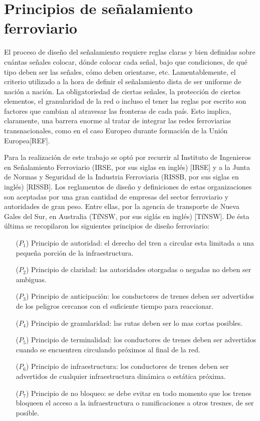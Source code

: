 \section{Principios de señalamiento ferroviario}
    \label{sec:principios}
    
    El proceso de diseño del señalamiento requiere reglas claras y bien definidas sobre cuántas señales colocar, dónde colocar cada señal, bajo que condiciones, de qué tipo deben ser las señales, cómo deben orientarse, etc. Lamentablemente, el criterio utilizado a la hora de definir el señalamiento dista de ser uniforme de nación a nación. La obligatoriedad de ciertas señales, la protección de ciertos elementos, el granularidad de la red o incluso el tener las reglas por escrito son factores que cambian al atravesar las fronteras de cada país. Esto implica, claramente, una barrera enorme al tratar de integrar las redes ferroviarias transnacionales, como en el caso Europeo durante formación de la Unión Europea[REF].
    
    Para la realización de este trabajo se optó por recurrir al Instituto de Ingenieros en Señalamiento Ferroviario (IRSE, por sus siglas en inglés) [IRSE] y a la Junta de Normas y Seguridad de la Industria Ferroviaria (RISSB, por sus siglas en inglés) [RISSB]. Los reglamentos de diseño y definiciones de estas organizaciones son aceptadas por una gran cantidad de empresas del sector ferroviario y autoridades de gran peso. Entre ellas, por la agencia de transporte de Nueva Gales del Sur, en Australia (TfNSW, por sus siglás en inglés) [TfNSW]. De ésta última se recopilaron los siguientes principios de diseño ferroviario:
    
    \begin{itemize}
        \item [($P_1$)] Principio de autoridad: el derecho del tren a circular esta limitada a una pequeña porción de la infraestructura.
        \item [($P_2$)] Principio de claridad: las autoridades otorgadas o negadas no deben ser ambiguas. 
        \item [($P_3$)] Principio de anticipación: los conductores de trenes deben ser advertidos de los peligros cercanos con el suficiente tiempo para reaccionar.
        \item [($P_4$)] Principio de granularidad: las rutas deben ser lo mas cortas posibles.
        \item [($P_5$)] Principio de terminalidad: los conductores de trenes deben ser advertidos cuando se encuentren circulando próximos al final de la red.
        \item [($P_6$)] Principio de infraestructura: los conductores de trenes deben ser advertidos de cualquier infraestructura dinámica o estática próxima.
        \item [($P_7$)] Principio de no bloqueo: se debe evitar en todo momento que los trenes bloqueen el acceso a la infraestructura o ramificaciones a otros tresnes, de ser posible.
    \end{itemize}

